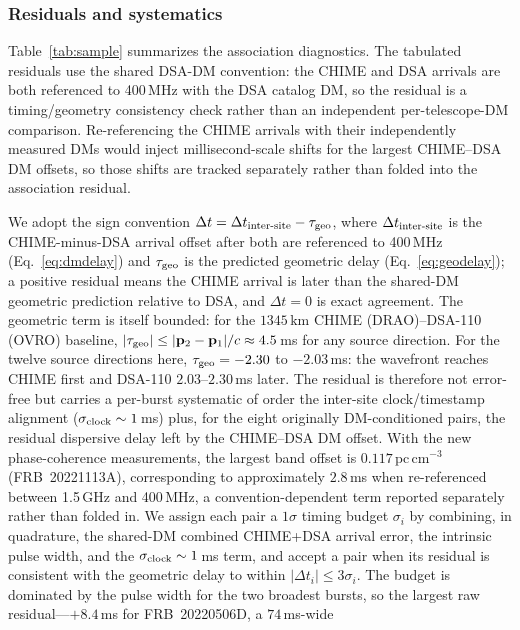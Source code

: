 \subsubsection{Residuals and systematics}

Table~\ref{tab:sample} summarizes the association diagnostics. The tabulated
residuals use the shared DSA-DM convention: the CHIME and DSA arrivals are both
referenced to 400\,MHz with the DSA catalog DM, so the residual is a
timing/geometry consistency check rather than an independent per-telescope-DM
comparison. Re-referencing the CHIME arrivals with their independently measured
DMs would inject millisecond-scale shifts for the largest CHIME--DSA DM offsets,
so those shifts are tracked separately rather than folded into the association
residual.

We adopt the sign convention $\Delta t = \Delta t_{\rm inter\text{-}site} -
\tau_{\rm geo}$, where $\Delta t_{\rm inter\text{-}site}$ is the CHIME-minus-DSA
arrival offset after both are referenced to 400\,MHz (Eq.~\ref{eq:dmdelay}) and
$\tau_{\rm geo}$ is the predicted geometric delay (Eq.~\ref{eq:geodelay}); a
positive residual means the CHIME arrival is later than the shared-DM geometric
prediction relative to DSA, and $\Delta t=0$ is exact agreement. The geometric
term is itself bounded: for the $1345\,\mathrm{km}$ CHIME (DRAO)--DSA-110 (OVRO)
baseline, $|\tau_{\rm geo}| \le |\mathbf{p}_2-\mathbf{p}_1|/c \approx 4.5\,$ms for
any source direction. For the twelve source directions here,
$\tau_{\rm geo}=-2.30$ to $-2.03\,$ms: the wavefront reaches CHIME first and
DSA-110 $2.03$--$2.30\,$ms later. The residual is therefore not error-free but carries a
per-burst systematic of order the inter-site clock/timestamp alignment
($\sigma_{\rm clock}\sim1$\,ms) plus, for the eight originally DM-conditioned
pairs, the residual dispersive delay left by the CHIME--DSA DM offset. With the
new phase-coherence measurements, the largest band offset is
$0.117\,\mathrm{pc\,cm^{-3}}$ (FRB~20221113A), corresponding to approximately
$2.8$\,ms when re-referenced between 1.5\,GHz and 400\,MHz,
a convention-dependent term reported separately rather than folded in. We
assign each pair a $1\sigma$ timing budget $\sigma_i$ by combining, in
quadrature, the shared-DM combined CHIME+DSA arrival error, the intrinsic pulse
width, and the $\sigma_{\rm clock}\sim1$\,ms term, and accept a pair when its
residual is consistent with the geometric delay to within $|\Delta t_i| \le
3\sigma_i$. The budget is dominated by the pulse width for the two broadest
bursts, so the largest raw residual---$+8.4$\,ms for FRB~20220506D, a $74$\,ms-wide
